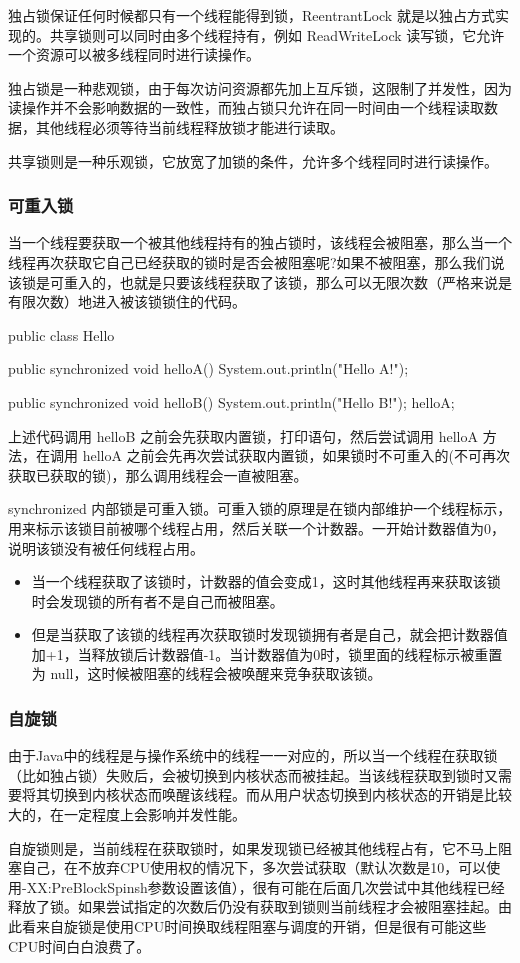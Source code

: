 独占锁保证任何时候都只有一个线程能得到锁，ReentrantLock 就是以独占方式实现的。共享锁则可以同时由多个线程持有，例如  ReadWriteLock  读写锁，它允许一个资源可以被多线程同时进行读操作。

独占锁是一种悲观锁，由于每次访问资源都先加上互斥锁，这限制了并发性，因为读操作并不会影响数据的一致性，而独占锁只允许在同一时间由一个线程读取数据，其他线程必须等待当前线程释放锁才能进行读取。

共享锁则是一种乐观锁，它放宽了加锁的条件，允许多个线程同时进行读操作。

\subsubsection*{可重入锁}

当一个线程要获取一个被其他线程持有的独占锁时，该线程会被阻塞，那么当一个线程再次获取它自己已经获取的锁时是否会被阻塞呢?如果不被阻塞，那么我们说该锁是可重入的，也就是只要该线程获取了该锁，那么可以无限次数（严格来说是有限次数）地进入被该锁锁住的代码。

\begin{Java}
public class Hello {
    public synchronized void helloA() {
        System.out.println("Hello A!");
    }

    public synchronized void helloB() {
        System.out.println("Hello B!");
        helloA;
    }
}
\end{Java}

上述代码调用 helloB 之前会先获取内置锁，打印语句，然后尝试调用 helloA 方法，在调用 helloA 之前会先再次尝试获取内置锁，如果锁时不可重入的(不可再次获取已获取的锁)，那么调用线程会一直被阻塞。

synchronized 内部锁是可重入锁。可重入锁的原理是在锁内部维护一个线程标示，用来标示该锁目前被哪个线程占用，然后关联一个计数器。一开始计数器值为0，说明该锁没有被任何线程占用。
\begin{itemize}
    \item 当一个线程获取了该锁时，计数器的值会变成1，这时其他线程再来获取该锁时会发现锁的所有者不是自己而被阻塞。
    \item 但是当获取了该锁的线程再次获取锁时发现锁拥有者是自己，就会把计数器值加+1，当释放锁后计数器值-1。当计数器值为0时，锁里面的线程标示被重置为 null，这时候被阻塞的线程会被唤醒来竞争获取该锁。
\end{itemize}

\subsubsection*{自旋锁}

由于Java中的线程是与操作系统中的线程一一对应的，所以当一个线程在获取锁（比如独占锁）失败后，会被切换到内核状态而被挂起。当该线程获取到锁时又需要将其切换到内核状态而唤醒该线程。而从用户状态切换到内核状态的开销是比较大的，在一定程度上会影响并发性能。

自旋锁则是，当前线程在获取锁时，如果发现锁已经被其他线程占有，它不马上阻塞自己，在不放弃CPU使用权的情况下，多次尝试获取（默认次数是10，可以使用-XX:PreBlockSpinsh参数设置该值），很有可能在后面几次尝试中其他线程已经释放了锁。如果尝试指定的次数后仍没有获取到锁则当前线程才会被阻塞挂起。由此看来自旋锁是使用CPU时间换取线程阻塞与调度的开销，但是很有可能这些CPU时间白白浪费了。

\newpage